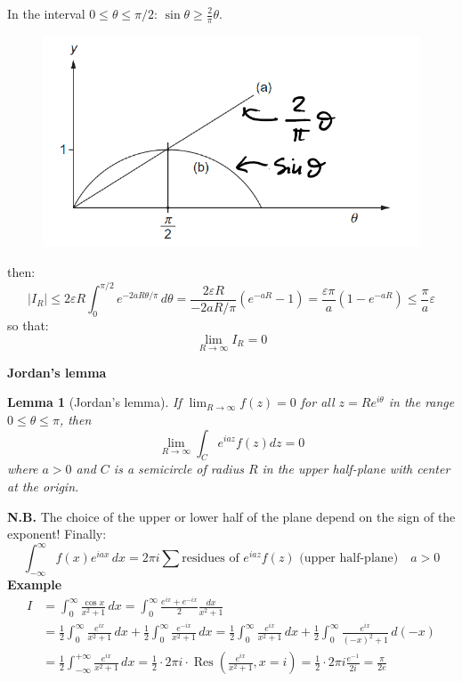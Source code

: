 \documentclass{article}
\newtheorem{lemma}[theorem]{Lemma}
\begin{document}
\newpage

\noindent
In the interval $0 \leq \theta \leq \pi/2$: $\sin\theta \geq \frac{2}{\pi}\theta$.

\begin{figure}[h]
    \centering
    \includegraphics[width=0.5\linewidth]{fig38.png}
\end{figure}

\noindent
then:
\begin{equation}
    |I_R| \leq 2\varepsilon R \int_0^{\pi/2} e^{-2aR\theta/\pi} \, d\theta
= \frac{2\varepsilon R}{-2aR/\pi} \left( e^{-aR} - 1 \right)
= \frac{\varepsilon \pi}{a} \left(1 - e^{-aR}\right)
\leq \frac{\pi}{a} \varepsilon
\end{equation}
so that:
\begin{equation}
    \lim_{R\rightarrow\infty} I_R = 0
\end{equation}

\vspace{2mm}\noindent
\textbf{Jordan’s lemma}
\begin{lemma}[Jordan’s lemma]
    If $\lim_{R\rightarrow\infty} f(z) = 0$ for all $z = Re^{i\theta}$ in the range $0 \leq \theta \leq \pi$, then
    \begin{equation}
        \lim_{R\rightarrow\infty} \int_C e^{iaz} f(z)dz = 0
    \end{equation}
    where $a>0$ and $C$ is a semicircle of radius $R$ in the upper half-plane with center at the origin.
\end{lemma}

\noindent
\textbf{N.B.} The choice of the upper or lower half of the plane depend on the sign of the exponent! Finally:
\begin{equation}
    \int_{-\infty}^{\infty} f(x) e^{iax} \, dx
= 2\pi i \sum \text{residues of } e^{iaz} f(z) \text{ (upper half-plane)} \quad \boxed{a>0}
\end{equation}
\textbf{Example}
\begin{align*}
    I &= \int_0^\infty \frac{\cos x}{x^2 + 1} \, dx
= \int_0^\infty \frac{e^{ix} + e^{-ix}}{2} \frac{dx}{x^2 + 1}\\
&= \frac{1}{2} \int_0^\infty \frac{e^{ix}}{x^2 + 1} \, dx
+ \frac{1}{2} \int_0^\infty \frac{e^{-ix}}{x^2 + 1} \, dx
= \frac{1}{2} \int_0^\infty \frac{e^{ix}}{x^2 + 1} \, dx
+ \frac{1}{2} \int_0^\infty \frac{e^{ix}}{(-x)^2 + 1} \, d(-x)\\
&= \frac{1}{2} \int_{-\infty}^{+\infty} \frac{e^{ix}}{x^2 + 1} \, dx
= \frac{1}{2} \cdot 2\pi i \cdot \operatorname{Res} \left( \frac{e^{ix}}{x^2 + 1}, x = i \right) = \frac12 \cdot 2\pi i \frac{e^{-1}}{2i} = \frac{\pi}{2e}
\end{align*}
\end{document}
